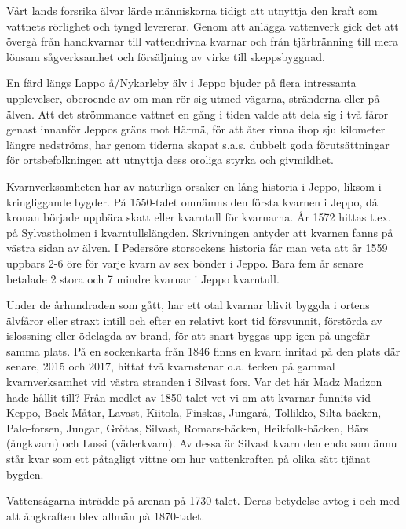 
Vårt lands forsrika älvar lärde människorna tidigt att utnyttja den kraft som vattnets rörlighet och tyngd levererar. Genom att anlägga vattenverk gick det att övergå från handkvarnar till vattendrivna kvarnar och från tjärbränning till mera lönsam sågverksamhet och försäljning av virke till skeppsbyggnad.

En färd längs Lappo å/Nykarleby älv i Jeppo bjuder på flera intressanta upplevelser, oberoende av om man rör sig utmed vägarna, stränderna eller på älven. Att det strömmande vattnet en gång i tiden valde att dela sig i två fåror genast innanför Jeppos gräns mot Härmä, för att åter rinna ihop sju kilometer längre nedströms, har genom tiderna skapat s.a.s. dubbelt goda förutsättningar för ortsbefolkningen att utnyttja dess oroliga styrka och givmildhet.

Kvarnverksamheten har av naturliga orsaker en lång historia i Jeppo, liksom i kringliggande bygder. På 1550-talet omnämns den första kvarnen i Jeppo, då kronan började uppbära skatt eller kvarntull för kvarnarna. År 1572 hittas t.ex.  på Sylvastholmen i kvarntullslängden. Skrivningen antyder att kvarnen fanns på västra sidan av älven. I Pedersöre storsockens historia får man veta att år 1559 uppbars 2-6 öre för varje kvarn av sex bönder i Jeppo. Bara fem år senare betalade 2 stora och 7 mindre kvarnar i Jeppo kvarntull.

Under de århundraden som gått, har ett otal kvarnar blivit byggda i ortens älvfåror eller straxt intill och efter en relativt kort tid försvunnit, förstörda av islossning eller ödelagda av brand, för att snart byggas upp igen på ungefär samma plats. På en sockenkarta från 1846 finns en kvarn inritad på den plats där  senare, 2015 och 2017, hittat två kvarnstenar o.a. tecken på gammal kvarnverksamhet vid västra stranden i Silvast fors. Var det här Madz Madzon hade hållit till? Från medlet av 1850-talet vet vi om att kvarnar funnits vid Keppo, Back-Måtar, Lavast, Kiitola, Finskas, Jungarå, Tollikko, Silta-bäcken, Palo-forsen, Jungar, Grötas, Silvast, Romars-bäcken, Heikfolk-bäcken, Bärs (ångkvarn) och Lussi (väderkvarn). Av dessa är Silvast kvarn den enda som ännu står kvar som ett påtagligt vittne om hur vattenkraften på olika sätt tjänat bygden.

Vattensågarna inträdde på arenan på 1730-talet. Deras betydelse avtog i och med att ångkraften blev allmän på 1870-talet.


